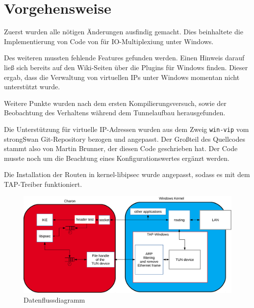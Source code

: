 



\section{Vorgehensweise}

Zuerst wurden alle nötigen Änderungen ausfindig gemacht. Dies beinhaltete
die Implementierung von Code von für IO-Multiplexiung unter Windows.

Des weiteren mussten fehlende Features gefunden werden. Einen Hinweis
darauf ließ sich bereits auf den Wiki-Seiten über die Plugins für Windows finden.
Dieser ergab, dass die Verwaltung von virtuellen IPs unter Windows momentan
nicht unterstützt wurde.

Weitere Punkte wurden nach dem ersten Kompilierungsversuch, sowie der Beobachtung
des Verhaltens während dem Tunnelaufbau herausgefunden.

Die Unterstützung für virtuelle IP-Adressen wurden aus dem Zweig \texttt{win-vip}
vom strongSwan Git-Repository bezogen und angepasst. Der Großteil des Quellcodes
stammt also von Martin Brunner, der diesen Code geschrieben hat. Der Code musste
noch um die Beachtung eines Konfigurationswertes ergänzt werden.

Die Installation der Routen in kernel-libipsec wurde angepasst, sodass es
mit dem TAP-Treiber funktioniert.

\begin{figure}[!ht]
\includegraphics[width=\textwidth]{Diagram.eps}
\caption{Datenflussdiagramm}
\label{fig:Datenflussdiagramm}
\end{figure}

